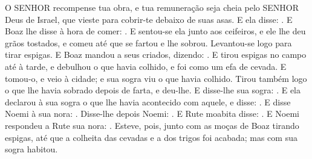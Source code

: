 {{  O SENHOR recompense tua obra, e tua remuneração seja cheia pelo SENHOR Deus de Israel, que vieste para cobrir-te debaixo de suas asas}.
  E ela disse: .
  E Boaz lhe disse à hora de comer: . E sentou-se ela junto aos ceifeiros, e ele lhe deu grãos tostados, e comeu até que se fartou e lhe sobrou.
  Levantou-se logo para tirar espigas. E Boaz mandou a seus criados, dizendo: .
  E tirou espigas no campo até à tarde, e debulhou o que havia colhido, e foi como um efa de cevada.
  E tomou-o, e veio à cidade; e sua sogra viu o que havia colhido. Tirou também logo o que lhe havia sobrado depois de farta, e deu-lhe.
  E disse-lhe sua sogra: . E ela declarou à sua sogra o que lhe havia acontecido com aquele, e disse: .
  E disse Noemi à sua nora: . Disse-lhe depois Noemi: .
  E Rute moabita disse: .
  E Noemi respondeu a Rute sua nora: . %
  Esteve, pois, junto com as moças de Boaz tirando espigas, até que a colheita das cevadas e a dos trigos foi acabada; mas com sua sogra habitou.
\par }

